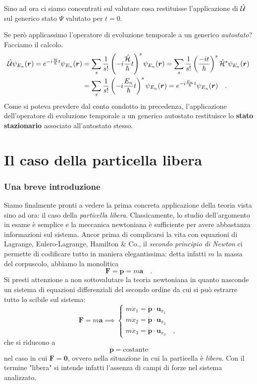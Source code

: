 \begin{approfondimento}[title={Altro sull'operatore di evoluzione temporale}]
    \noindent
    Sino ad ora ci siamo concentrati sul valutare cosa restituisse l'applicazione di $\hat{\mathcal{U}}$ sul generico stato $\Psi$ valutato per $t = 0$. 

    Se però applicassimo l'operatore di evoluzione temporale a un generico \emph{autostato}? Facciamo il calcolo.
    \[
    \begin{aligned}
        \hat{\mathcal{U}}\psi_{E_n}(\bm{r}) = e^{-i\frac{\hat{\mathcal{H}}}{\hbar}t}\psi_{E_n}(\bm{r}) &= \sum_s \frac{1}{s!}\left(-i\frac{\hat{\mathcal{H}}}{\hbar}t\right)^s \psi_{E_n}(\bm{r}) = \sum_s \frac{1}{s!}\left(\frac{-it}{\hbar}\right)^s \hat{\mathcal{H}}^s\psi_{E_n}(\bm{r})\\
        &= \sum_s \frac{1}{s!}\left(-i\frac{{E_n}}{\hbar}t\right)^s \psi_{E_n}(\bm{r}) = e^{-i\frac{E_n}{\hbar}t}\psi_{E_n}(\bm{r}) \quad.
    \end{aligned}
    \]
    Come si poteva prevdere dal conto condotto in precedenza, l'applicazione dell'operatore di evoluzione temporale a un generico autostato restituisce lo \textbf{stato stazionario} associato all'autostato stesso.
\end{approfondimento}

\section{Il caso della particella libera}

\subsubsection{Una breve introduzione}
Siamo finalmente pronti a vedere la prima concreta applicazione della teoria vista sino ad ora: il caso della \emph{particella libera}. Classicamente, lo studio dell'argomento in esame è semplice e la meccanica newtoniana è sufficiente per avere abbastanza informazioni sul sistema. Ancor prima di complicarsi la vita con equazioni di Lagrange, Eulero-Lagrange, Hamilton \& Co., il \emph{secondo principio di Newton} ci permette di codificare tutto in maniera elegantissima: detta infatti $m$ la massa del corpuscolo, abbiamo la monolitica
\[
    \bm{F} = \dot{\bm{p}} = m\bm{a} \quad.
\]
Si presti attenzione a non sottovalutare la teoria newtoniana in quanto nasconde un sistema di equazioni differenziali del secondo ordine da cui si può estrarre tutto lo scibile sul sistema:
\[
    \bm{F} = m\bm{a} \implies 
    \begin{cases}
        m\ddot{x}_1 = \dot{\bm{p}} \cdot \bm{u}_{x_1} \\
        m\ddot{x}_2 = \dot{\bm{p}} \cdot \bm{u}_{x_2} \\
        m\ddot{x}_3 = \dot{\bm{p}} \cdot \bm{u}_{x_3} \quad,
    \end{cases}
\]
che si riducono a 
\[
\bm{p} = \text{costante}
\]
nel caso in cui $\bm{F} = \bm{0}$, ovvero nella situazione in cui la particella è \emph{libera}. Con il termine "libera" si intende infatti l'assenza di campi di forze nel sistema analizzato.

